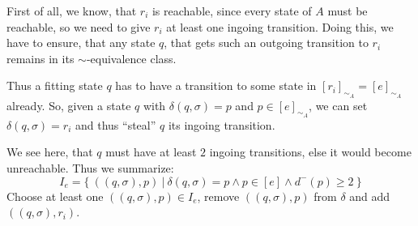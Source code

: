 First of all, we know, that $r_i$ is reachable, since every state of $A$ must be reachable, so we need to give $r_i$ at least one ingoing transition. Doing this, we have to ensure, that any state $q$, that gets such an outgoing transition to $r_i$ remains in its $\sim$-equivalence class.
	
Thus a fitting state $q$ has to have a transition to some state in $[r_i]_{\sim_A} = [e]_{\sim_A}$ already. So, given a state $q$ with $\delta(q, \sigma) = p$ and $p \in [e]_{\sim_A}$, we can set $\delta(q, \sigma) = r_i$ and thus ``steal'' $q$ its ingoing transition.

We see here, that $q$ must have at least $2$ ingoing transitions, else it would become unreachable. Thus we summarize:
\[
    I_e = \{\ ((q, \sigma), p)\ |\ \delta(q, \sigma) = p \land p \in [e] \land d^-(p) \geq 2\ \}
\]
Choose at least one $((q, \sigma), p) \in I_e$, remove $((q, \sigma), p)$ from $\delta$ and add $((q, \sigma), r_i)$. 

